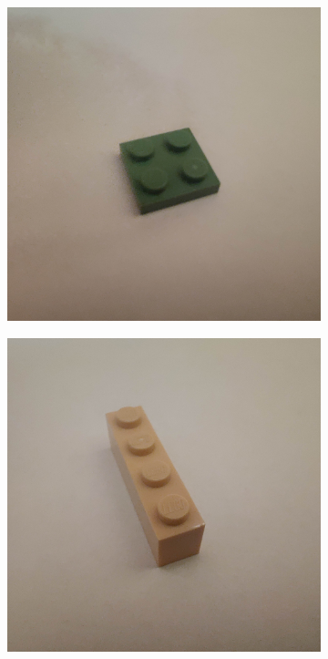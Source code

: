 \documentclass[]{article}
\begin{document}
\begin{figure}[h]
\begin{subfigure}[b]{0.2\textwidth}
    \end{subfigure}
    \begin{subfigure}[b]{0.2\textwidth}
        \includegraphics[width=\textwidth]{photographed images/11.jpg}
    \end{subfigure}
    \begin{subfigure}[b]{0.2\textwidth}
        \includegraphics[width=\textwidth]{photographed images/12.jpg}

\end{subfigure}
\end{figure}
\end{document}
